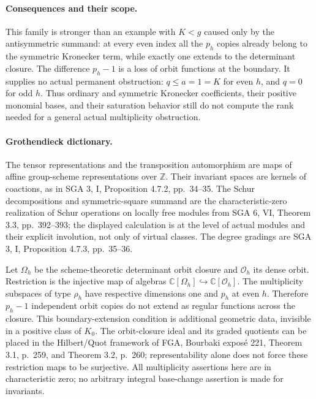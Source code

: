 \paragraph{Consequences and their scope.}
This family is stronger than an example with \(K<g\) caused only
by the antisymmetric summand: at every even index all the \(p_h\)
copies already belong to the symmetric Kronecker term, while exactly
one extends to the determinant closure. The difference
\(p_h-1\) is a loss of orbit functions at the boundary.
It supplies no actual permanent obstruction: \(q\leq a=1=K\)
for even \(h\), and \(q=0\) for odd \(h\). Thus ordinary and
symmetric Kronecker coefficients, their positive monomial bases,
and their saturation behavior still do not compute the rank needed
for a general actual multiplicity obstruction.

\paragraph{Grothendieck dictionary.}
The tensor representations and the transposition automorphism are
maps of affine group-scheme representations over \(\mathbb Z\).
Their invariant spaces are kernels of coactions, as in SGA 3, I,
Proposition 4.7.2, pp.~34--35. The Schur decompositions and
symmetric-square summand are the characteristic-zero realization
of Schur operations on locally free modules from SGA 6, VI,
Theorem 3.3, pp.~392--393; the displayed calculation is at the
level of actual modules and their explicit involution, not only
of virtual classes. The degree gradings are SGA 3, I,
Proposition 4.7.3, pp.~35--36.

Let \(\Omega_h\) be the scheme-theoretic determinant orbit closure
and \(\mathcal O_h\) its dense orbit. Restriction is the injective
map of algebras
\(\mathbb C[\Omega_h]\hookrightarrow\mathbb C[\mathcal O_h]\).
The multiplicity subspaces of type \(\rho_h\) have respective
dimensions one and \(p_h\) at even \(h\). Therefore \(p_h-1\)
independent orbit copies do not extend as regular functions across
the closure. This boundary-extension condition is additional
geometric data, invisible in a positive class of \(K_0\).
The orbit-closure ideal and its graded quotients can be placed in
the Hilbert/Quot framework of FGA, Bourbaki expos\'e 221,
Theorem 3.1, p.~259, and Theorem 3.2, p.~260; representability
alone does not force these restriction maps to be surjective.
All multiplicity assertions here are in characteristic zero;
no arbitrary integral base-change assertion is made for invariants.
